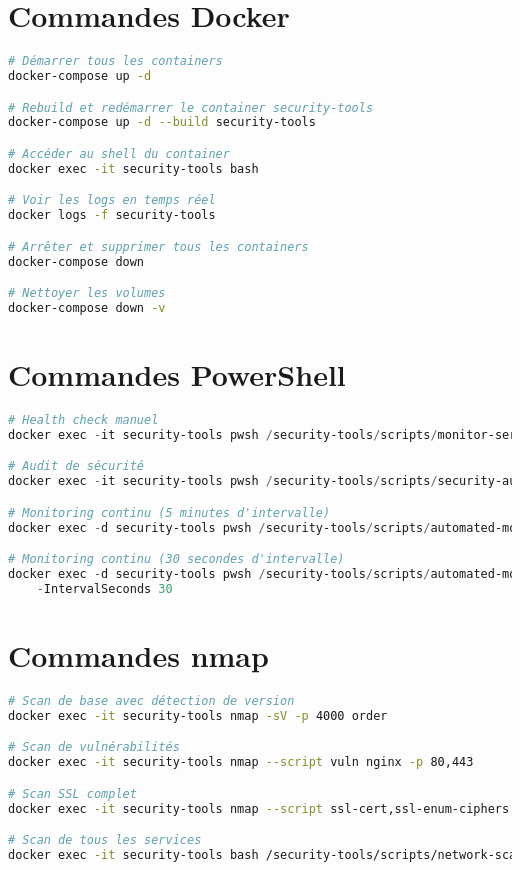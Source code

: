 \documentclass[11pt,a4paper]{report}
\begin{document}
\section{Commandes Docker}

\begin{lstlisting}[language=bash, caption=Commandes Docker Utiles]
# Démarrer tous les containers
docker-compose up -d

# Rebuild et redémarrer le container security-tools
docker-compose up -d --build security-tools

# Accéder au shell du container
docker exec -it security-tools bash

# Voir les logs en temps réel
docker logs -f security-tools

# Arrêter et supprimer tous les containers
docker-compose down

# Nettoyer les volumes
docker-compose down -v
\end{lstlisting}

\section{Commandes PowerShell}

\begin{lstlisting}[language=PowerShell, caption=Commandes PowerShell Utiles]
# Health check manuel
docker exec -it security-tools pwsh /security-tools/scripts/monitor-services.ps1

# Audit de sécurité
docker exec -it security-tools pwsh /security-tools/scripts/security-audit.ps1

# Monitoring continu (5 minutes d'intervalle)
docker exec -d security-tools pwsh /security-tools/scripts/automated-monitor.ps1

# Monitoring continu (30 secondes d'intervalle)
docker exec -d security-tools pwsh /security-tools/scripts/automated-monitor.ps1 `
    -IntervalSeconds 30
\end{lstlisting}

\section{Commandes nmap}

\begin{lstlisting}[language=bash, caption=Commandes nmap Courantes]
# Scan de base avec détection de version
docker exec -it security-tools nmap -sV -p 4000 order

# Scan de vulnérabilités
docker exec -it security-tools nmap --script vuln nginx -p 80,443

# Scan SSL complet
docker exec -it security-tools nmap --script ssl-cert,ssl-enum-ciphers nginx -p 443

# Scan de tous les services
docker exec -it security-tools bash /security-tools/scripts/network-scan.sh
\end{lstlisting}
\end{document}
